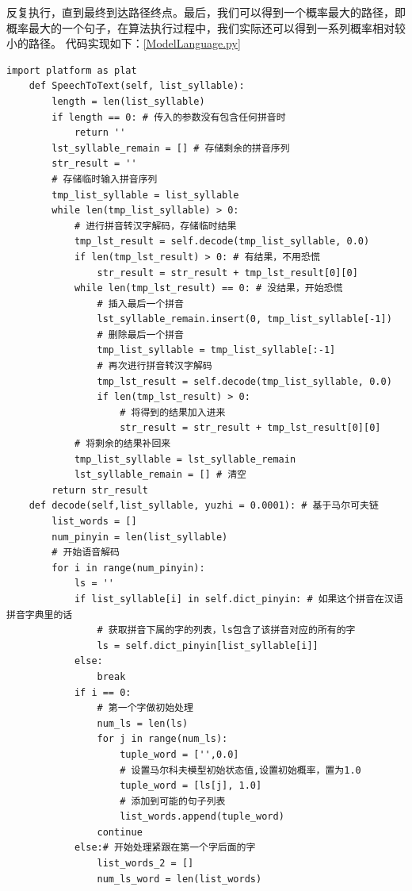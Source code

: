 \documentclass[12pt,a4paper,fancyhdr,openany,oneside]{ctexbook}
\begin{document}
反复执行，直到最终到达路径终点。最后，我们可以得到一个概率最大的路径，即概率最大的一个句子，在算法执行过程中，我们实际还可以得到一系列概率相对较小的路径。
代码实现如下：\ref{ModelLanguage.py}
\begin{lstlisting}[style=Python, caption={ModelLanguage.py}, label={ModelLanguage.py}]
    import platform as plat
    def SpeechToText(self, list_syllable):
        length = len(list_syllable)
        if length == 0: # 传入的参数没有包含任何拼音时
            return ''
        lst_syllable_remain = [] # 存储剩余的拼音序列
        str_result = ''
        # 存储临时输入拼音序列
        tmp_list_syllable = list_syllable
        while len(tmp_list_syllable) > 0:
            # 进行拼音转汉字解码，存储临时结果
            tmp_lst_result = self.decode(tmp_list_syllable, 0.0)
            if len(tmp_lst_result) > 0: # 有结果，不用恐慌
                str_result = str_result + tmp_lst_result[0][0]
            while len(tmp_lst_result) == 0: # 没结果，开始恐慌
                # 插入最后一个拼音
                lst_syllable_remain.insert(0, tmp_list_syllable[-1])
                # 删除最后一个拼音
                tmp_list_syllable = tmp_list_syllable[:-1]
                # 再次进行拼音转汉字解码
                tmp_lst_result = self.decode(tmp_list_syllable, 0.0)
                if len(tmp_lst_result) > 0:
                    # 将得到的结果加入进来
                    str_result = str_result + tmp_lst_result[0][0]
            # 将剩余的结果补回来
            tmp_list_syllable = lst_syllable_remain
            lst_syllable_remain = [] # 清空
        return str_result
    def decode(self,list_syllable, yuzhi = 0.0001): # 基于马尔可夫链
        list_words = []
        num_pinyin = len(list_syllable)
        # 开始语音解码
        for i in range(num_pinyin):
            ls = ''
            if list_syllable[i] in self.dict_pinyin: # 如果这个拼音在汉语拼音字典里的话
                # 获取拼音下属的字的列表，ls包含了该拼音对应的所有的字
                ls = self.dict_pinyin[list_syllable[i]]
            else:
                break
            if i == 0:
                # 第一个字做初始处理
                num_ls = len(ls)
                for j in range(num_ls):
                    tuple_word = ['',0.0]
                    # 设置马尔科夫模型初始状态值,设置初始概率，置为1.0
                    tuple_word = [ls[j], 1.0]
                    # 添加到可能的句子列表
                    list_words.append(tuple_word)
                continue
            else:# 开始处理紧跟在第一个字后面的字
                list_words_2 = []
                num_ls_word = len(list_words)

\end{lstlisting}
\end{document}
